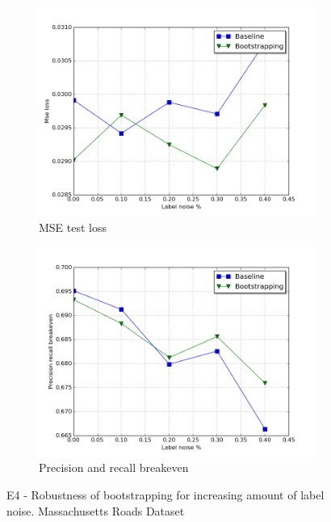 \begin{figure}[p]
\begin{subfigure}{0.48\textwidth}
\includegraphics[width=\linewidth]{figs/E3/E3_lc_noise.png}
\caption{MSE test loss} \label{fig:E3_boot_mass_loss}
\end{subfigure}
\hspace*{\fill} %
\begin{subfigure}{0.48\textwidth}
\includegraphics[width=\linewidth]{figs/E3/E3_pr_noise.png}
\caption{Precision and recall breakeven} \label{fig:E3_boot_mass_pr}
\end{subfigure}
\hspace*{\fill} %
\caption{E4 - Robustness of bootstrapping for increasing amount of label noise. Massachusetts Roads Dataset} \label{fig:E3_boot_mass}
\end{figure}

